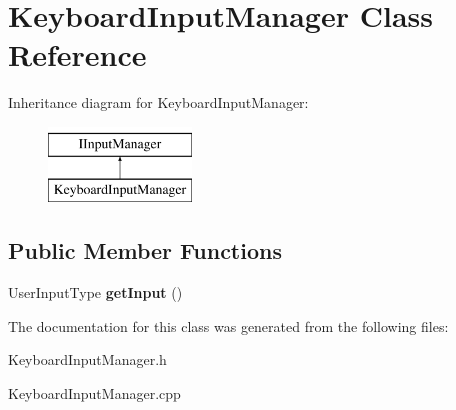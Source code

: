 \hypertarget{class_keyboard_input_manager}{}\section{Keyboard\+Input\+Manager Class Reference}
\label{class_keyboard_input_manager}
Inheritance diagram for Keyboard\+Input\+Manager\+:\begin{figure}[H]
\begin{center}
\leavevmode
\includegraphics[height=2.000000cm]{class_keyboard_input_manager}
\end{center}
\end{figure}
\subsection*{Public Member Functions}
\begin{DoxyCompactItemize}
\item 
\mbox{\label{class_keyboard_input_manager_a8cb1844b5ac0c023294a6a2378440c92}} 
User\+Input\+Type {\bfseries get\+Input} ()
\end{DoxyCompactItemize}


The documentation for this class was generated from the following files\+:\begin{DoxyCompactItemize}
\item 
Keyboard\+Input\+Manager.\+h\item 
Keyboard\+Input\+Manager.\+cpp\end{DoxyCompactItemize}
